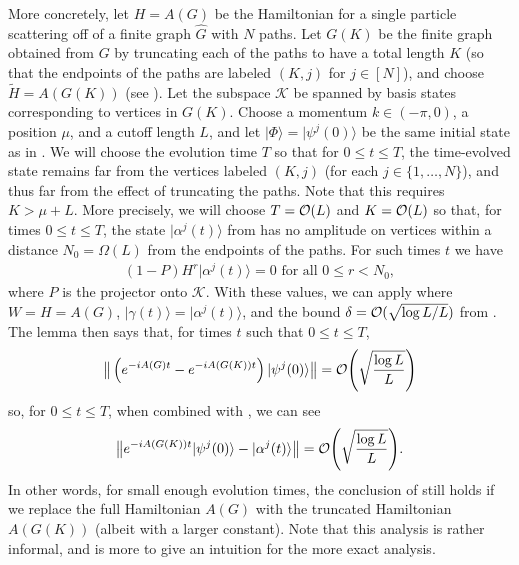 \documentclass[../thesis-main/thesis-main]{subfiles}
\begin{document}
More concretely, let $H=A(G)$ be the Hamiltonian for a single particle scattering off of a finite graph $\widehat{G}$ with $N$ paths.  Let $G(K)$ be the finite graph obtained from $G$ by truncating each of the paths to have a total length $K$ (so that the endpoints of the paths are labeled $(K,j)$ for $j\in [N]$), and choose $\widetilde{H}=A(G(K))$ (see ). Let the subspace $\mathcal{K}$ be spanned by basis states corresponding to vertices in $G(K)$.  Choose a momentum $k\in (-\pi,0)$, a position $\mu$, and a cutoff length $L$, and let $|\Phi\rangle=|\psi^j(0)\rangle$ be the same initial state as in .  We will choose the evolution time $T$ so that for $0\leq t\leq T$, the time-evolved state remains far from the vertices labeled $(K,j)$ (for each $j\in\{1,\ldots,N\}$), and thus far from the effect of truncating the paths.  Note that this requires $K > \mu + L$.  More precisely, we will choose $T=\mathcal{O}(L)$ and $K = \mathcal{O}(L)$ so that, for times $0\leq t\leq T$, the state $|\alpha^j (t)\rangle$ from  has no amplitude on vertices within a distance $N_0=\Omega(L)$ from the endpoints of the paths. For such times $t$ we have
\begin{align}
\left(1-P\right)H^r |\alpha^j \left(t\right)\rangle=0 \text{ for all } 0\leq  r < N_0,
\end{align}
where $P$ is the projector onto $\mathcal{K}$.   With these values, we can apply  where $W=H=A(G)$, $|\gamma(t)\rangle=|\alpha^j(t)\rangle$, and the bound $\delta=\mathcal{O}(\sqrt{\log L/L})$ from . The lemma then says that, for times $t$ such that $0\leq t\leq T$,
\begin{equation}
  \big\Vert \left(e^{-iA(G) t}-e^{-iA(G(K))t}\right)|\psi^{j}(0)\rangle \big\Vert=\mathcal{O}\Bigg(\sqrt{\frac{\log L}{L}}\Bigg)
\end{equation}
so, for $0\leq t\leq T$, when combined with , we can see
\begin{align}
  \big\Vert e^{-iA(G(K)) t}|\psi^{j}(0)\rangle-|\alpha^{j}(t)\rangle \big\Vert =\mathcal{O}\Bigg(\sqrt{\frac{\log L}{L}}\Bigg).
    \label{eq:trunc_paths}
\end{align}
In other words, for small enough evolution times, the conclusion of  still holds if we replace the full Hamiltonian $A(G)$ with the truncated Hamiltonian $A(G(K))$ (albeit with a larger constant).  Note that this analysis is rather informal, and is more to give an intuition for the more exact analysis.
\end{document}
